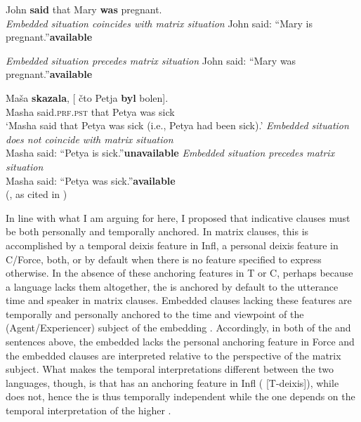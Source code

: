 \documentclass[output=paper,modfonts,newtxmath,hidelinks,]{langscibook}
\begin{document}
\ea \label{10:ex31}
	John \textbf{said} that Mary \textbf{was} pregnant.\\
	\ea \label{10:ex31a}
    \textit{Embedded situation coincides with matrix situation}
    \newline John said: “Mary is pregnant.”\hfill\textbf{available}
    
	\ex \label{10:ex31b}
    \textit{Embedded situation precedes matrix situation}
    \newline John said: “Mary was pregnant.”\hfill\textbf{available}
    
	\z
\z

\ea \label{10:ex32}
\gll Maša \textbf{skazala}, [\hspace{-2pt} čto Petja \textbf{byl} bolen].\\
    Masha said.\textsc{prf.pst} {} that Petya was sick\\
\glt `Masha said that Petya was sick (i.e., Petya had been sick).'
\ea \textit{Embedded situation does not coincide with matrix situation}\\
      Masha said: “Petya is sick.”\hfill\textbf{unavailable}
\ex      \textit{Embedded situation precedes matrix situation}\\
	Masha said: “Petya was sick.”\hfill\textbf{available}\\\hfill (\citealt[183]{Kondrashova1999}, as cited in \citealt[174]{Mezhevich2006})
\z\z

\noindent In line with what I am arguing for here, I proposed that indicative clauses must be both personally and temporally anchored. In matrix clauses, this is accomplished by a temporal deixis feature in Infl, a personal deixis feature in C/Force, both, or by default when there is no feature specified to express otherwise. In the absence of these anchoring features in T or C, perhaps because a language lacks them altogether, the  is anchored by default to the utterance time and speaker in matrix clauses. Embedded clauses lacking these features are temporally and personally anchored to the time and viewpoint of the (Agent/Experiencer) subject of the embedding . Accordingly, in both of the  and  sentences above, the embedded  lacks the personal anchoring feature in Force and the embedded clauses are interpreted relative to the perspective of the matrix subject. What makes the temporal interpretations different between the two languages, though, is that  has an anchoring feature in Infl ( [T-deixis]), while  does not, hence the   is thus temporally independent while the  one depends on the temporal interpretation of the higher .
\end{document}
